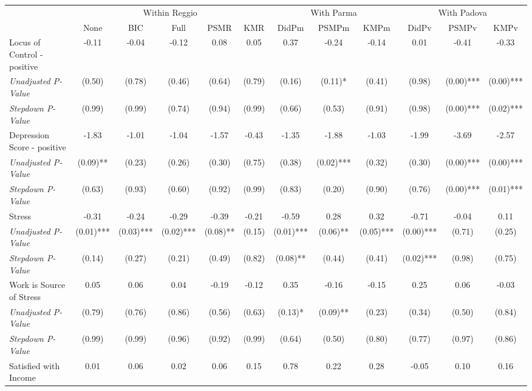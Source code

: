 \begin{tabular}{l c c c c c c c c c c c}
\toprule
& \multicolumn{5}{c}{Within Reggio} & \multicolumn{3}{c}{With Parma} & \multicolumn{3}{c}{With Padova} \\\cmidrule(lr){2-6} \cmidrule(lr){7-9} \cmidrule(lr){10-12}
 & None & BIC & Full & PSMR & KMR & DidPm & PSMPm & KMPm & DidPv & PSMPv & KMPv \\
\midrule
Locus of Control - positive & -0.11 & -0.04 & -0.12 & 0.08 & 0.05 & 0.37 & -0.24 & -0.14 & 0.01 & -0.41 & -0.33 \\
\quad \textit{Unadjusted P-Value} & (0.50) & (0.78) & (0.46) & (0.64) & (0.79) & (0.16) & (0.11)* & (0.41) & (0.98) & (0.00)*** & (0.00)*** \\
\quad \textit{Stepdown P-Value} & (0.99) & (0.99) & (0.74) & (0.94) & (0.99) & (0.66) & (0.53) & (0.91) & (0.98) & (0.00)*** & (0.02)*** \\
Depression Score - positive & -1.83 & -1.01 & -1.04 & -1.57 & -0.43 & -1.35 & -1.88 & -1.03 & -1.99 & -3.69 & -2.57 \\
\quad \textit{Unadjusted P-Value} & (0.09)** & (0.23) & (0.26) & (0.30) & (0.75) & (0.38) & (0.02)*** & (0.32) & (0.30) & (0.00)*** & (0.00)*** \\
\quad \textit{Stepdown P-Value} & (0.63) & (0.93) & (0.60) & (0.92) & (0.99) & (0.83) & (0.20) & (0.90) & (0.76) & (0.00)*** & (0.01)*** \\
Stress & -0.31 & -0.24 & -0.29 & -0.39 & -0.21 & -0.59 & 0.28 & 0.32 & -0.71 & -0.04 & 0.11 \\
\quad \textit{Unadjusted P-Value} & (0.01)*** & (0.03)*** & (0.02)*** & (0.08)** & (0.15) & (0.01)*** & (0.06)** & (0.05)*** & (0.00)*** & (0.71) & (0.25) \\
\quad \textit{Stepdown P-Value} & (0.14) & (0.27) & (0.21) & (0.49) & (0.82) & (0.08)** & (0.44) & (0.41) & (0.02)*** & (0.98) & (0.75) \\
Work is Source of Stress & 0.05 & 0.06 & 0.04 & -0.19 & -0.12 & 0.35 & -0.16 & -0.15 & 0.25 & 0.06 & -0.03 \\
\quad \textit{Unadjusted P-Value} & (0.79) & (0.76) & (0.86) & (0.56) & (0.63) & (0.13)* & (0.09)** & (0.23) & (0.34) & (0.50) & (0.84) \\
\quad \textit{Stepdown P-Value} & (0.99) & (0.99) & (0.96) & (0.92) & (0.99) & (0.64) & (0.50) & (0.80) & (0.77) & (0.97) & (0.86) \\
Satisfied with Income & 0.01 & 0.06 & 0.02 & 0.06 & 0.15 & 0.78 & 0.22 & 0.28 & -0.05 & 0.10 & 0.16 \\

\end{tabular}
